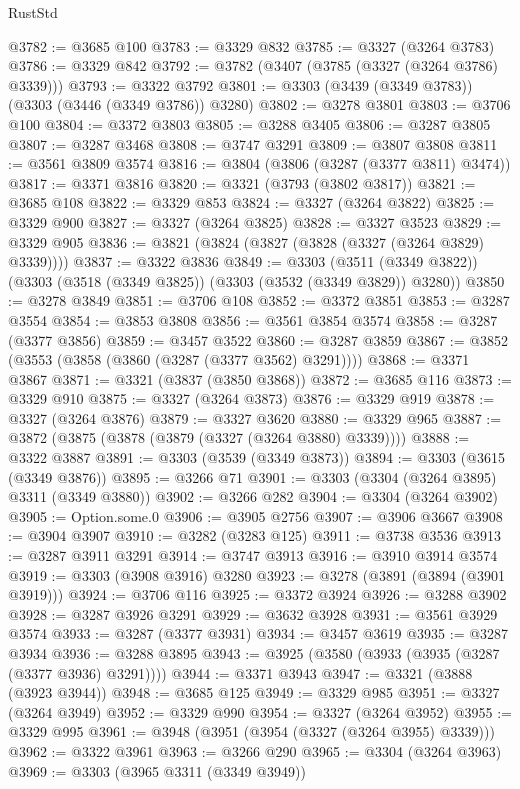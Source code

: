 \begin{lexlean}{RustStd}
\begin{coremodule}
{\begin{coremodule}
{{{{{{{{{{{{{{{{{{{{{{{{{{{{{{{{{@3782 := @3685 @100
@3783 := @3329 @832
@3785 := @3327 (@3264 @3783)
@3786 := @3329 @842
@3792 := @3782 (@3407 (@3785 (@3327 (@3264 @3786) @3339)))
@3793 := @3322 @3792
@3801 := @3303 (@3439 (@3349 @3783)) (@3303 (@3446 (@3349 @3786)) @3280)
@3802 := @3278 @3801
@3803 := @3706 @100
@3804 := @3372 @3803
@3805 := @3288 @3405
@3806 := @3287 @3805
@3807 := @3287 @3468
@3808 := @3747 @3291
@3809 := @3807 @3808
@3811 := @3561 @3809 @3574
@3816 := @3804 (@3806 (@3287 (@3377 @3811) @3474))
@3817 := @3371 @3816
@3820 := @3321 (@3793 (@3802 @3817))
@3821 := @3685 @108
@3822 := @3329 @853
@3824 := @3327 (@3264 @3822)
@3825 := @3329 @900
@3827 := @3327 (@3264 @3825)
@3828 := @3327 @3523
@3829 := @3329 @905
@3836 := @3821 (@3824 (@3827 (@3828 (@3327 (@3264 @3829) @3339))))
@3837 := @3322 @3836
@3849 := @3303
    (@3511 (@3349 @3822))
    (@3303 (@3518 (@3349 @3825)) (@3303 (@3532 (@3349 @3829)) @3280))
@3850 := @3278 @3849
@3851 := @3706 @108
@3852 := @3372 @3851
@3853 := @3287 @3554
@3854 := @3853 @3808
@3856 := @3561 @3854 @3574
@3858 := @3287 (@3377 @3856)
@3859 := @3457 @3522
@3860 := @3287 @3859
@3867 := @3852 (@3553 (@3858 (@3860 (@3287 (@3377 @3562) @3291))))
@3868 := @3371 @3867
@3871 := @3321 (@3837 (@3850 @3868))
@3872 := @3685 @116
@3873 := @3329 @910
@3875 := @3327 (@3264 @3873)
@3876 := @3329 @919
@3878 := @3327 (@3264 @3876)
@3879 := @3327 @3620
@3880 := @3329 @965
@3887 := @3872 (@3875 (@3878 (@3879 (@3327 (@3264 @3880) @3339))))
@3888 := @3322 @3887
@3891 := @3303 (@3539 (@3349 @3873))
@3894 := @3303 (@3615 (@3349 @3876))
@3895 := @3266 @71
@3901 := @3303 (@3304 (@3264 @3895) @3311 (@3349 @3880))
@3902 := @3266 @282
@3904 := @3304 (@3264 @3902)
@3905 := Option.some.{0}
@3906 := @3905 @2756
@3907 := @3906 @3667
@3908 := @3904 @3907
@3910 := @3282 (@3283 @125)
@3911 := @3738 @3536
@3913 := @3287 @3911 @3291
@3914 := @3747 @3913
@3916 := @3910 @3914 @3574
@3919 := @3303 (@3908 @3916) @3280
@3923 := @3278 (@3891 (@3894 (@3901 @3919)))
@3924 := @3706 @116
@3925 := @3372 @3924
@3926 := @3288 @3902
@3928 := @3287 @3926 @3291
@3929 := @3632 @3928
@3931 := @3561 @3929 @3574
@3933 := @3287 (@3377 @3931)
@3934 := @3457 @3619
@3935 := @3287 @3934
@3936 := @3288 @3895
@3943 := @3925 (@3580 (@3933 (@3935 (@3287 (@3377 @3936) @3291))))
@3944 := @3371 @3943
@3947 := @3321 (@3888 (@3923 @3944))
@3948 := @3685 @125
@3949 := @3329 @985
@3951 := @3327 (@3264 @3949)
@3952 := @3329 @990
@3954 := @3327 (@3264 @3952)
@3955 := @3329 @995
@3961 := @3948 (@3951 (@3954 (@3327 (@3264 @3955) @3339)))
@3962 := @3322 @3961
@3963 := @3266 @290
@3965 := @3304 (@3264 @3963)
@3969 := @3303 (@3965 @3311 (@3349 @3949))
}}}}}}}}}}}}}}}}}}}}}}}}}}}}}}}}}
\end{coremodule}}
\end{coremodule}
\end{lexlean}
